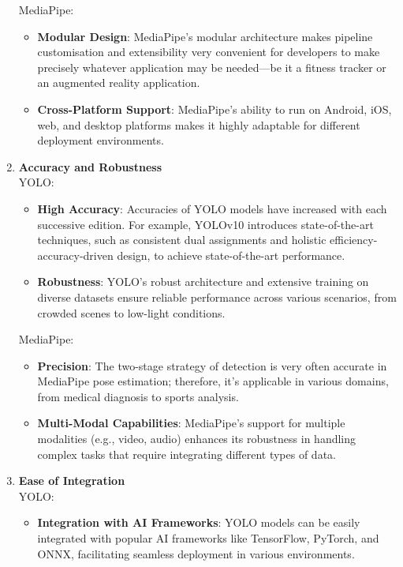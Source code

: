 \begin{enumerate}
\begin{itemize}
            \end{itemize}
            MediaPipe:
            \begin{itemize}
                \item \textbf{Modular Design}: MediaPipe's modular architecture makes pipeline customisation and extensibility very convenient for developers to make precisely whatever application may be needed—be it a fitness tracker or an augmented reality application.
                \item \textbf{Cross-Platform Support}: MediaPipe’s ability to run on Android, iOS, web, and desktop platforms makes it highly adaptable for different deployment environments.
            \end{itemize}
            \item \textbf{Accuracy and Robustness}\\
            YOLO:
            \begin{itemize}
                \item \textbf{High Accuracy}: Accuracies of YOLO models have increased with each successive edition. For example, YOLOv10 introduces state-of-the-art techniques, such as consistent dual assignments and holistic efficiency-accuracy-driven design, to achieve state-of-the-art performance.
                \item \textbf{Robustness}: YOLO’s robust architecture and extensive training on diverse datasets ensure reliable performance across various scenarios, from crowded scenes to low-light conditions.
            \end{itemize}
            MediaPipe:
            \begin{itemize}
                \item \textbf{Precision}: The two-stage strategy of detection is very often accurate in MediaPipe pose estimation; therefore, it's applicable in various domains, from medical diagnosis to sports analysis.
                \item \textbf{Multi-Modal Capabilities}: MediaPipe’s support for multiple modalities (e.g., video, audio) enhances its robustness in handling complex tasks that require integrating different types of data.
            \end{itemize}
            \item \textbf{Ease of Integration}\\
            YOLO:
            \begin{itemize}
                \item \textbf{Integration with AI Frameworks}: YOLO models can be easily integrated with popular AI frameworks like TensorFlow, PyTorch, and ONNX, facilitating seamless deployment in various environments.

\end{itemize}
\end{enumerate}
